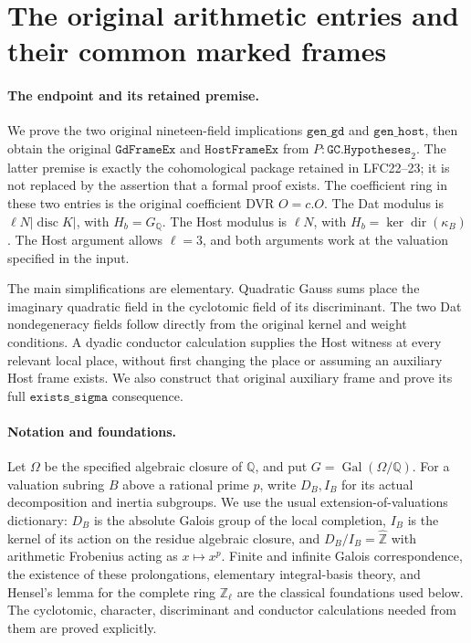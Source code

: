 \section{The original arithmetic entries and their common marked frames}
\label{sec:arithmetic-frame-entries}

\paragraph{The endpoint and its retained premise.}
We prove the two original nineteen-field implications
\(\texttt{gen\_gd}\) and \(\texttt{gen\_host}\), then obtain the
original \(\texttt{GdFrameEx}\) and \(\texttt{HostFrameEx}\) from
\(P:\texttt{GC.Hypotheses}_{2}\).
The latter premise is exactly the cohomological package retained
in LFC22--23; it is not replaced by the assertion that a formal
proof exists.  The coefficient ring in these two entries is the
original coefficient DVR \(O=c.O\).
The Dat modulus is \(\ell N|\operatorname{disc}K|\), with
\(H_b=G_{\mathbb Q}\).  The Host modulus is \(\ell N\), with
\(H_b=\ker\operatorname{dir}(\kappa_B)\).
The Host argument allows \(\ell=3\), and both arguments work at
the valuation specified in the input.

The main simplifications are elementary.  Quadratic Gauss sums
place the imaginary quadratic field in the cyclotomic field of
its discriminant.  The two Dat nondegeneracy fields follow
directly from the original kernel and weight conditions.
A dyadic conductor calculation supplies the Host witness at
every relevant local place, without first changing the place
or assuming an auxiliary Host frame exists.  We also construct
that original auxiliary frame and prove its full
\(\texttt{exists\_sigma}\) consequence.

\paragraph{Notation and foundations.}
Let \(\Omega\) be the specified algebraic closure of \(\mathbb Q\),
and put \(G=\operatorname{Gal}(\Omega/\mathbb Q)\).
For a valuation subring \(B\) above a rational prime \(p\), write
\(D_B,I_B\) for its actual decomposition and inertia subgroups.
We use the usual extension-of-valuations dictionary: \(D_B\)
is the absolute Galois group of the local completion, \(I_B\)
is the kernel of its action on the residue algebraic closure,
and \(D_B/I_B=\widehat{\mathbb Z}\) with arithmetic Frobenius
acting as \(x\mapsto x^p\).
Finite and infinite Galois correspondence, the existence of
these prolongations, elementary integral-basis theory, and
Hensel's lemma for the complete ring \(\mathbb Z_\ell\) are
the classical foundations used below.  The cyclotomic,
character, discriminant and conductor calculations needed
from them are proved explicitly.


